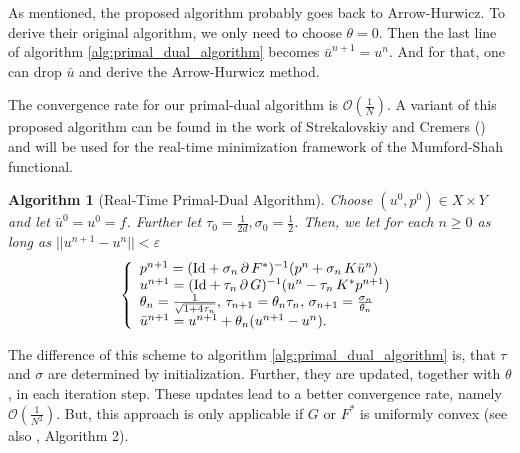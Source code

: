 \documentclass{scrreprt}
\newtheorem{algorithm}[theorem]{Algorithm}
\begin{document}
        As mentioned, the proposed algorithm probably goes back to Arrow-Hurwicz. To derive their original algorithm, we only need to choose $\theta = 0$. Then the last line of algorithm \ref{alg:primal_dual_algorithm} becomes $\bar{u}^{n+1} = u^{n}$. And for that, one can drop $\bar{u}$ and derive the Arrow-Hurwicz method.

        The convergence rate for our primal-dual algorithm is $\mathcal{O}\left(\frac{1}{N}\right)$. A variant of this proposed algorithm can be found in the work of Strekalovskiy and Cremers (\cite{Strekalovskiy-Cremers-eccv14}) and will be used for the real-time minimization framework of the Mumford-Shah functional.

        \begin{algorithm}[Real-Time Primal-Dual Algorithm]
        \label{alg:realtime_primal_dual_algorithm}
            Choose $(u^{0}, p^{0}) \in X \times Y$ and let $\bar{u}^{0} = u^{0} = f$. Further let $\tau_{0} = \frac{1}{2d}, \sigma_{0} = \frac{1}{2}$. Then, we let for each $n \ge 0$ as long as $||u^{n+1} - u^{n}|| < \varepsilon$
                $$
                    \left\{ 
                        \begin{array}{l l}
                            p^{n+1} = (\textnormal{Id} + \sigma_{n}\,\partial\,F^{\ast})^{-1}(p^{n} + \sigma_{n}\,K\bar{u}^{n}) \\
                            u^{n+1} = (\textnormal{Id} + \tau_{n}\,\partial\,G)^{-1}(u^{n} - \tau_{n}\,K^{\ast}p^{n+1}) \\
                            \theta_{n} = \frac{1}{\sqrt{1 + 4\tau_{n}}}, \, \tau_{n+1} = \theta_{n}\tau_{n}, \, \sigma_{n+1} = \frac{\sigma_{n}}{\theta_{n}} \\
                            \bar{u}^{n+1} = u^{n+1} + \theta_{n} (u^{n+1} - u^{n}).
                        \end{array}
                    \right.
                $$
        \end{algorithm}

        The difference of this scheme to algorithm \ref{alg:primal_dual_algorithm} is, that $\tau$ and $\sigma$ are determined by initialization. Further, they are updated, together with $\theta$, in each iteration step. These updates lead to a better convergence rate, namely $\mathcal{O}\left(\frac{1}{N^{2}}\right)$. But, this approach is only applicable if $G$ or $F^{\ast}$ is uniformly convex (see also \cite{Chambolle10afirst-order}, Algorithm 2).

\end{document}
